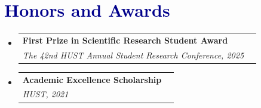 \documentclass[a4paper,11pt]{article}
\makeatletter
\newcommand{\resumeItem}[2]{
  \item{
    \textbf{#1}{\hspace{0.5mm}#2 \vspace{-0.5mm}}
  }
}
\newcommand{\resumeProject}[3]{ %
\vspace{0.5mm}\item
    \begin{tabular*}{0.98\textwidth}[t]{l@{\extracolsep{\fill}}r}
        \textbf{#1} & \textit{\footnotesize{#3}} \\
        \footnotesize{\textit{#2}}
    \end{tabular*}
    \vspace{-2.4mm}
}
\newcommand{\resumeSubItem}[2]{\resumeItem{#1}{#2}\vspace{-4pt}}
\newcommand{\resumeSubHeadingListStart}{\begin{itemize}[leftmargin=*,labelsep=1mm]}
\newcommand{\resumeHeadingSkillStart}{\begin{itemize}[leftmargin=*,itemsep=1.7mm, rightmargin=2ex]}
\newcommand{\resumeItemListStart}{\begin{itemize}[leftmargin=*,labelsep=1mm,itemsep=0.5mm]}
\newcommand{\resumeSubHeadingListEnd}{\end{itemize}\vspace{2mm}}
\newcommand{\resumeHeadingSkillEnd}{\end{itemize}\vspace{-2mm}}
\newcommand{\resumeItemListEnd}{\end{itemize}\vspace{-2mm}}
\makeatother
\begin{document}
\vspace{-2.5mm}

\section{\textcolor{darkblue}{\textbf{Honors and Awards}}}
\vspace{-0.4mm}
\resumeSubHeadingListStart

\resumeProject
  {First Prize in Scientific Research Student Award }
  {The 42nd HUST Annual Student Research Conference, 2025}
  {}

\resumeProject
  {Academic Excellence Scholarship}
  {HUST, 2021}
  {}





\resumeSubHeadingListEnd

\vspace{-6mm}




\end{document}
